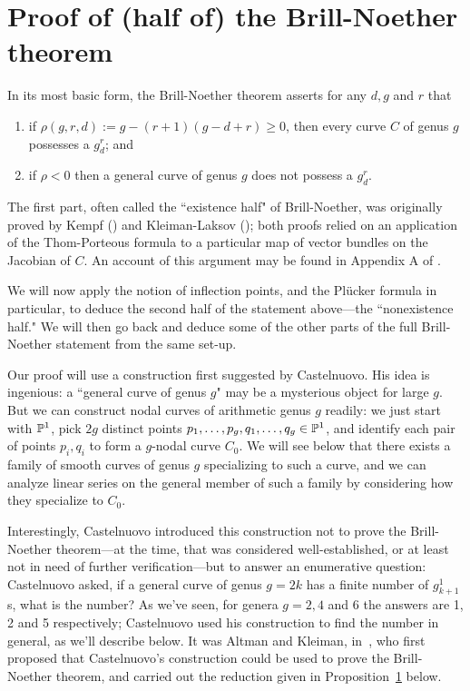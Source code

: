 \section{Proof of (half of) the Brill-Noether theorem}

In its most basic form, the Brill-Noether theorem asserts for any $d, g$ and $r$ that
\begin{enumerate}
\item if $\rho(g,r,d) := g - (r+1)(g-d+r) \geq 0$, then every curve $C$ of genus $g$ possesses a $g^r_d$; and
\item if $\rho < 0$ then a general curve of genus $g$ does not possess a $g^r_d$.
\end{enumerate}

The first part, often called the ``existence half" of Brill-Noether, was originally proved by Kempf (\cite{}) and Kleiman-Laksov (\cite{}); both proofs relied on an application of the Thom-Porteous formula to a particular map of vector bundles on the Jacobian of $C$. An account of this argument may  be found in Appendix A of \cite{}. 

We will now apply the notion of inflection points, and the Pl\"ucker formula in particular, to deduce the second half of the statement above---the ``nonexistence half." We will then go back and deduce some of the other parts of the  full Brill-Noether statement from the same set-up.

Our proof will use a construction first suggested by Castelnuovo. His idea is ingenious: a ``general curve of genus $g$" may be a mysterious object for large $g$. But we can construct nodal curves of arithmetic genus $g$ readily: we just start with ${\mathbb P}^1$, pick $2g$ distinct points $p_1,\dots,p_g, q_1,\dots,q_g \in {\mathbb P}^1$, and identify each pair of points $p_i, q_i$ to form a $g$-nodal curve $C_0$. We will see below that there exists a family of smooth curves of genus $g$ specializing to such a curve, and we can analyze linear series on the general member of such a family by considering how they specialize to $C_0$.

Interestingly, Castelnuovo introduced this construction not to prove the Brill-Noether theorem---at the time, that was considered well-established, or at least not in need of further verification---but to answer an enumerative question: Castelnuovo asked, if a general curve of genus $g = 2k$ has a finite number of $g^1_{k+1}$s, what is the number? As we've seen, for genera $g = 2, 4$ and 6 the answers are 1, 2 and 5 respectively; Castelnuovo used his construction to find the number in general, as we'll describe below. It was Altman and Kleiman, in~\cite{}, who first proposed that Castelnuovo's construction could be used to prove the Brill-Noether theorem, and carried out the reduction given in Proposition~\ref{} below.

